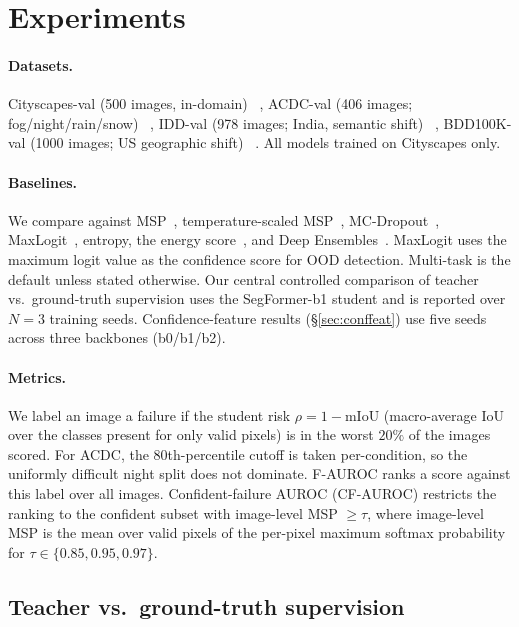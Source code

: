 \documentclass{article}
\begin{document}
\section{Experiments}


\paragraph{Datasets.} Cityscapes-val (500 images, in-domain) ~\cite{cordts2016cityscapes}, ACDC-val (406 images; fog/night/rain/snow) ~\cite{sakaridis2021acdc}, IDD-val (978 images; India, semantic shift) ~\cite{varma2019idd}, BDD100K-val (1000 images; US geographic shift) ~\cite{yu2020bdd100k}. All models trained on Cityscapes only.


\paragraph{Baselines.} We compare against MSP~\cite{hendrycks2017baseline}, temperature-scaled MSP~\cite{guo2017calibration}, MC-Dropout~\cite{gal2016dropout}, MaxLogit~\cite{hendrycks2022scaling}, entropy, the energy score~\cite{liu2020energy}, and Deep Ensembles~\cite{lakshminarayanan2017deepensembles}. MaxLogit uses the maximum logit value as the confidence score for OOD detection. Multi-task is the default unless stated otherwise. Our central controlled comparison of teacher vs.\ ground-truth supervision uses the SegFormer-b1 student and is reported over $N=3$ training seeds. Confidence-feature results (\S\ref{sec:conffeat}) use five seeds across three backbones (b0/b1/b2).


\paragraph{Metrics.} We label an image a failure if the student risk $\rho = 1 - \mathrm{mIoU}$ (macro-average IoU over the classes present for only valid pixels) is in the worst $20\%$ of the images scored. For ACDC, the $80$th-percentile cutoff is taken per-condition, so the uniformly difficult night split does not dominate. F-AUROC ranks a score against this label over all images. Confident-failure AUROC (CF-AUROC) restricts the ranking to the confident subset with image-level MSP $\geq \tau$, where image-level MSP is the mean over valid pixels of the per-pixel maximum softmax probability for $\tau \in \{0.85, 0.95, 0.97\}$.


\subsection{Teacher vs.\ ground-truth supervision}
\end{document}

